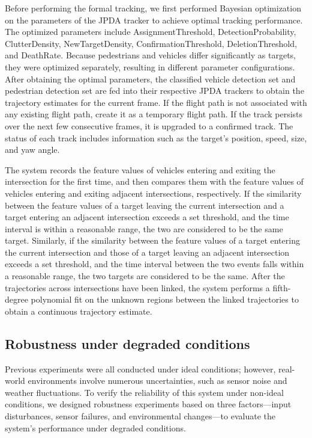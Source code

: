 \documentclass[lineno,pdflatex,sn-basic]{sn-jnl}%
\theoremstyle{thmstyleone}%
\theoremstyle{thmstyletwo}%
\theoremstyle{thmstylethree}%
\begin{document}
Before performing the formal tracking, we first performed Bayesian optimization on the parameters of the JPDA tracker to achieve optimal tracking performance.
The optimized parameters include AssignmentThreshold, DetectionProbability, ClutterDensity, NewTargetDensity, ConfirmationThreshold, DeletionThreshold, and DeathRate.
Because pedestrians and vehicles differ significantly as targets, they were optimized separately, resulting in different parameter configurations.
After obtaining the optimal parameters, the classified vehicle detection set and pedestrian detection set are fed into their respective JPDA trackers to obtain the trajectory estimates for the current frame.
If the flight path is not associated with any existing flight path, create it as a temporary flight path.
If the track persists over the next few consecutive frames, it is upgraded to a confirmed track.
The status of each track includes information such as the target's position, speed, size, and yaw angle.

The system records the feature values of vehicles entering and exiting the intersection for the first time, and then compares them with the feature values of vehicles entering and exiting adjacent intersections, respectively.
If the similarity between the feature values of a target leaving the current intersection and a target entering an adjacent intersection exceeds a set threshold, and the time interval is within a reasonable range, the two are considered to be the same target.
Similarly, if the similarity between the feature values of a target entering the current intersection and those of a target leaving an adjacent intersection exceeds a set threshold, and the time interval between the two events falls within a reasonable range, the two targets are considered to be the same.
After the trajectories across intersections have been linked, the system performs a fifth-degree polynomial fit on the unknown regions between the linked trajectories to obtain a continuous trajectory estimate.



\subsection{Robustness under degraded conditions}
Previous experiments were all conducted under ideal conditions; however, real-world environments involve numerous uncertainties, such as sensor noise and weather fluctuations.
To verify the reliability of this system under non-ideal conditions, we designed robustness experiments based on three factors—input disturbances, sensor failures, and environmental changes—to evaluate the system’s performance under degraded conditions.
\end{document}
